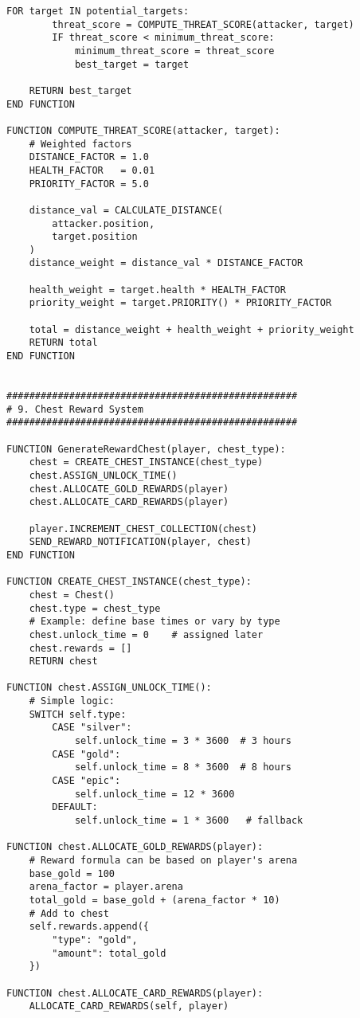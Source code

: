 \documentclass{article}
\begin{document}
\begin{lstlisting}[style=pseudo]
    FOR target IN potential_targets:
        threat_score = COMPUTE_THREAT_SCORE(attacker, target)
        IF threat_score < minimum_threat_score:
            minimum_threat_score = threat_score
            best_target = target

    RETURN best_target
END FUNCTION

FUNCTION COMPUTE_THREAT_SCORE(attacker, target):
    # Weighted factors
    DISTANCE_FACTOR = 1.0
    HEALTH_FACTOR   = 0.01
    PRIORITY_FACTOR = 5.0

    distance_val = CALCULATE_DISTANCE(
        attacker.position, 
        target.position
    )
    distance_weight = distance_val * DISTANCE_FACTOR

    health_weight = target.health * HEALTH_FACTOR
    priority_weight = target.PRIORITY() * PRIORITY_FACTOR

    total = distance_weight + health_weight + priority_weight
    RETURN total
END FUNCTION


###################################################
# 9. Chest Reward System
###################################################

FUNCTION GenerateRewardChest(player, chest_type):
    chest = CREATE_CHEST_INSTANCE(chest_type)
    chest.ASSIGN_UNLOCK_TIME()
    chest.ALLOCATE_GOLD_REWARDS(player)
    chest.ALLOCATE_CARD_REWARDS(player)

    player.INCREMENT_CHEST_COLLECTION(chest)
    SEND_REWARD_NOTIFICATION(player, chest)
END FUNCTION

FUNCTION CREATE_CHEST_INSTANCE(chest_type):
    chest = Chest()
    chest.type = chest_type
    # Example: define base times or vary by type
    chest.unlock_time = 0    # assigned later
    chest.rewards = []
    RETURN chest

FUNCTION chest.ASSIGN_UNLOCK_TIME():
    # Simple logic: 
    SWITCH self.type:
        CASE "silver":
            self.unlock_time = 3 * 3600  # 3 hours
        CASE "gold":
            self.unlock_time = 8 * 3600  # 8 hours
        CASE "epic":
            self.unlock_time = 12 * 3600
        DEFAULT:
            self.unlock_time = 1 * 3600   # fallback

FUNCTION chest.ALLOCATE_GOLD_REWARDS(player):
    # Reward formula can be based on player's arena
    base_gold = 100
    arena_factor = player.arena
    total_gold = base_gold + (arena_factor * 10)
    # Add to chest
    self.rewards.append({
        "type": "gold",
        "amount": total_gold
    })

FUNCTION chest.ALLOCATE_CARD_REWARDS(player):
    ALLOCATE_CARD_REWARDS(self, player)


\end{lstlisting}
\end{document}
